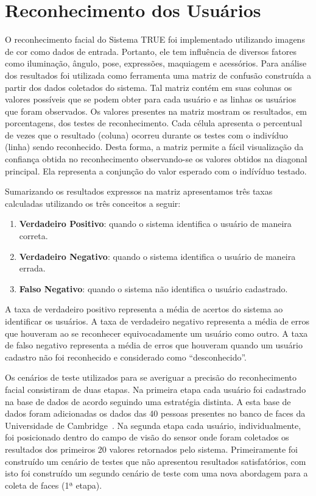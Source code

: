 \section{Reconhecimento dos Usuários}
	 
	O reconhecimento facial do Sistema TRUE foi implementado utilizando imagens de cor como dados de entrada. Portanto, ele tem influência de diversos fatores como iluminação, ângulo, pose, expressões, maquiagem e acessórios. Para análise dos resultados foi utilizada como ferramenta uma matriz de confusão construída a partir dos dados coletados do sistema. Tal matriz contém em suas colunas os valores possíveis que se podem obter para cada usuário e as linhas os usuários que foram observados. Os valores presentes na matriz mostram os resultados, em porcentagens, dos testes de reconhecimento. Cada célula apresenta o percentual de vezes que o resultado (coluna) ocorreu durante os testes com o indivíduo (linha) sendo reconhecido. Desta forma, a matriz permite a fácil visualização da confiança obtida no reconhecimento observando-se os valores obtidos na diagonal principal. Ela representa a conjunção do valor esperado com o indívíduo testado.

	Sumarizando os resultados expressos na matriz apresentamos três taxas calculadas utilizando os três conceitos a seguir:

	\begin{enumerate}
		\item \textbf{Verdadeiro Positivo}: quando o sistema identifica o usuário de maneira correta.
		\item \textbf{Verdadeiro Negativo}: quando o sistema identifica o usuário de maneira errada.
		\item \textbf{Falso Negativo}: quando o sistema não identifica o usuário cadastrado.
	\end{enumerate}

	A taxa de verdadeiro positivo representa a média de acertos do sistema ao identificar os usuários. A taxa de verdadeiro negativo representa a média de erros que houveram ao se reconhecer equivocadamente um usuário como outro. A taxa de falso negativo representa a média de erros que houveram quando um usuário cadastro não foi reconhecido e considerado como ``desconhecido''.

	Os cenários de teste utilizados para se averiguar a precisão do reconhecimento facial consistiram de duas etapas. Na primeira etapa cada usuário foi cadastrado na base de dados de acordo seguindo uma estratégia distinta. A esta base de dados foram adicionadas os dados das 40 pessoas presentes no banco de faces da Universidade de Cambridge~\cite{cambridgeFaceDb}. Na segunda etapa cada usuário, individualmente, foi posicionado dentro do campo de visão do sensor onde foram coletados os resultados dos primeiros 20 valores retornados pelo sistema. Primeiramente foi construído um cenário de testes que não apresentou resultados satisfatórios, com isto foi construído um segundo cenário de teste com uma nova abordagem para a coleta de faces (1ª etapa).

